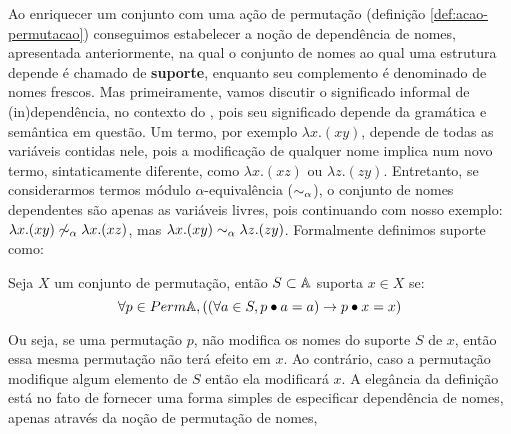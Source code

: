 Ao enriquecer um conjunto com uma ação de permutação (definição \ref{def:acao-permutacao}) conseguimos estabelecer a noção de dependência de nomes, apresentada anteriormente, na qual o conjunto de nomes ao qual uma estrutura depende é chamado de \textbf{suporte}, enquanto seu complemento é denominado de nomes frescos.
Mas primeiramente, vamos discutir o significado informal de (in)dependência, no contexto do \lcalc, pois seu significado depende da gramática e semântica em questão. Um termo, por exemplo $\lambda x. (xy)$, depende de todas as variáveis contidas nele, pois a modificação de qualquer nome implica num novo termo, sintaticamente diferente, como $\lambda x. (xz)$ ou $\lambda z. (zy)$. Entretanto, se considerarmos termos módulo $\alpha$-equivalência ($\sim_{\alpha}$), o conjunto de nomes dependentes são apenas as variáveis livres, pois continuando com nosso exemplo: $\lambda x. (xy) \not\sim_{\alpha} \lambda x. (xz)$, mas $\lambda x. (xy) \sim_{\alpha} \lambda z. (zy)$. Formalmente definimos suporte como:
\begin{definicao}[Suporte]
	Seja $X$ um conjunto de permutação, então $S \subset \mathbb{A}$ suporta $x \in X$ se:
	\begin{equation}\label{eq:suporte}
		\forall p \in Perm \mathbb{A}, ((\forall a \in S, p \bullet a = a) \rightarrow p \bullet x = x)
	\end{equation}
\end{definicao}\noindent
Ou seja, se uma permutação $p$, não modifica os nomes do suporte $S$ de $x$, então essa mesma permutação não terá efeito em $x$. Ao contrário, caso a permutação modifique algum elemento de $S$ então ela modificará $x$. A elegância da definição está no fato de fornecer uma forma simples de especificar dependência de nomes, apenas através da noção de permutação de nomes, 

